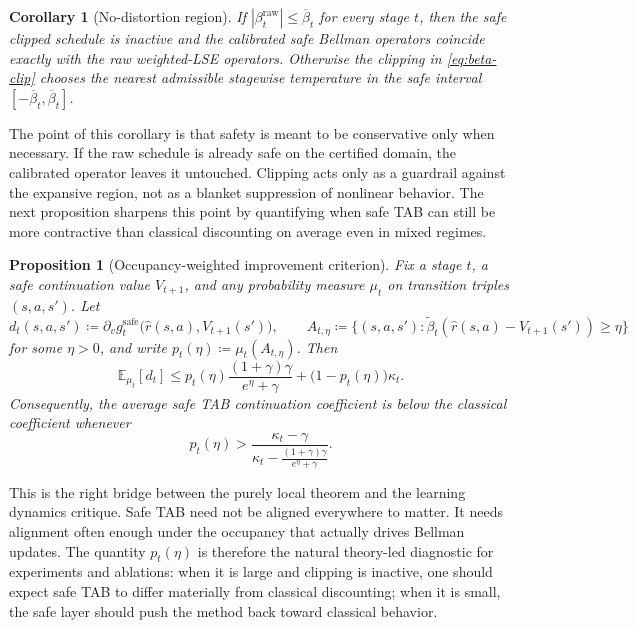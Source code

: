 \documentclass{article}
\newtheorem{proposition}[proposition]{Proposition}
\newtheorem{corollary}[corollary]{Corollary}
\theoremstyle{remark}
\newcommand{\E}{\mathbb{E}}
\newcommand{\defeq}{\coloneqq}
\newcommand{\safe}{\mathrm{safe}}
\newcommand{\betacap}{\overline\beta}
\begin{document}
\begin{corollary}[No-distortion region]
\label{cor:no-distortion}
If $|\beta_t^{\mathrm{raw}}|\le \betacap_t$ for every stage $t$, then the safe clipped schedule is inactive and the calibrated safe Bellman operators coincide exactly with the raw weighted-LSE operators.
Otherwise the clipping in \eqref{eq:beta-clip} chooses the nearest admissible stagewise temperature in the safe interval $[-\betacap_t,\betacap_t]$.
\end{corollary}

The point of this corollary is that safety is meant to be conservative only when necessary. If the raw schedule is already safe on the certified domain, the calibrated operator leaves it untouched. Clipping acts only as a guardrail against the expansive region, not as a blanket suppression of nonlinear behavior. The next proposition sharpens this point by quantifying when safe TAB can still be more contractive than classical discounting on average even in mixed regimes.

\begin{proposition}[Occupancy-weighted improvement criterion]
\label{prop:occupancy-improvement}
Fix a stage $t$, a safe continuation value $V_{t+1}$, and any probability measure $\mu_t$ on transition triples $(s,a,s')$. Let
\[
d_t(s,a,s')\defeq \partial_v g_t^{\safe}\bigl(\hat r(s,a),V_{t+1}(s')\bigr),
\qquad
A_{t,\eta}\defeq\bigl\{(s,a,s'): \widetilde\beta_t(\hat r(s,a)-V_{t+1}(s'))\ge \eta\bigr\}
\]
for some $\eta>0$, and write $p_t(\eta)\defeq \mu_t(A_{t,\eta})$. Then
\begin{equation}
\E_{\mu_t}[d_t]
\le
p_t(\eta)\frac{(1+\gamma)\gamma}{e^{\eta}+\gamma}
+
\bigl(1-p_t(\eta)\bigr)\kappa_t.
\label{eq:occupancy-improvement}
\end{equation}
Consequently, the average safe TAB continuation coefficient is below the classical coefficient whenever
\begin{equation}
p_t(\eta)
>
\frac{\kappa_t-\gamma}{\kappa_t-\frac{(1+\gamma)\gamma}{e^{\eta}+\gamma}}.
\label{eq:occupancy-threshold}
\end{equation}
\end{proposition}

This is the right bridge between the purely local theorem and the learning dynamics critique. Safe TAB need not be aligned everywhere to matter. It needs alignment often enough under the occupancy that actually drives Bellman updates. The quantity $p_t(\eta)$ is therefore the natural theory-led diagnostic for experiments and ablations: when it is large and clipping is inactive, one should expect safe TAB to differ materially from classical discounting; when it is small, the safe layer should push the method back toward classical behavior.
\end{document}
